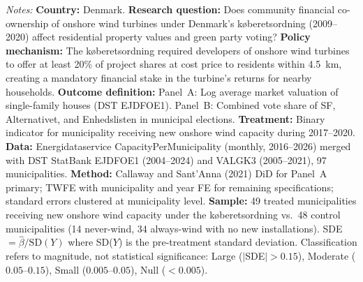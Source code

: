 \begin{table}[!ht]
\begin{tablenotes}[flushleft]
\item \textit{Notes:} \textbf{Country:} Denmark. \textbf{Research question:} Does community financial co-ownership of onshore wind turbines under Denmark's k{\o}beretsordning (2009--2020) affect residential property values and green party voting? \textbf{Policy mechanism:} The k{\o}beretsordning required developers of onshore wind turbines to offer at least 20\% of project shares at cost price to residents within 4.5~km, creating a mandatory financial stake in the turbine's returns for nearby households. \textbf{Outcome definition:} Panel~A: Log average market valuation of single-family houses (DST EJDFOE1). Panel~B: Combined vote share of SF, Alternativet, and Enhedslisten in municipal elections. \textbf{Treatment:} Binary indicator for municipality receiving new onshore wind capacity during 2017--2020. \textbf{Data:} Energidataservice CapacityPerMunicipality (monthly, 2016--2026) merged with DST StatBank EJDFOE1 (2004--2024) and VALGK3 (2005--2021), 97 municipalities. \textbf{Method:} Callaway and Sant'Anna (2021) DiD for Panel~A primary; TWFE with municipality and year FE for remaining specifications; standard errors clustered at municipality level. \textbf{Sample:} 49 treated municipalities receiving new onshore wind capacity under the k{\o}beretsordning vs.\ 48 control municipalities (14 never-wind, 34 always-wind with no new installations). SDE $= \hat{\beta} / \text{SD}(Y)$ where SD($Y$) is the pre-treatment standard deviation. Classification refers to magnitude, not statistical significance: Large ($|$SDE$| > 0.15$), Moderate ($0.05$--$0.15$), Small ($0.005$--$0.05$), Null ($< 0.005$).
\end{tablenotes}
\end{table}
